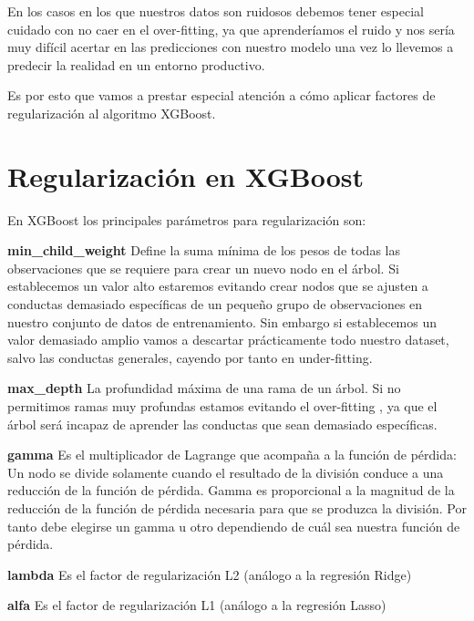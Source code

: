 En los casos en los que nuestros datos son ruidosos debemos tener especial cuidado con no caer en el over-fitting, ya que aprenderíamos el ruido y nos sería muy difícil acertar en las predicciones con nuestro modelo una vez lo llevemos a predecir la realidad en un entorno productivo.

Es por esto que vamos a prestar especial atención a cómo aplicar factores de regularización al algoritmo XGBoost.

\section{Regularización en XGBoost}

En XGBoost los principales parámetros para regularización son:

\textbf{min\_child\_weight}
Define la suma mínima de los pesos de todas las observaciones que se requiere para crear un nuevo nodo en el árbol.
Si establecemos un valor alto estaremos evitando crear nodos que se ajusten a conductas demasiado específicas de un pequeño grupo de observaciones en nuestro conjunto de datos de entrenamiento.
Sin embargo si establecemos un valor demasiado amplio vamos a descartar prácticamente todo nuestro dataset, salvo las conductas generales, cayendo por tanto en under-fitting.


\textbf{max\_depth} 
La profundidad máxima de una rama de un árbol.
Si no permitimos ramas muy profundas estamos evitando el over-fitting , ya que el árbol será incapaz de aprender las conductas que sean demasiado específicas.

\textbf{gamma}
Es el multiplicador de Lagrange que acompaña a la función de pérdida:
Un nodo se divide solamente cuando el resultado de la división conduce a una reducción de la función de pérdida. Gamma es proporcional a la magnitud de la reducción de la función de pérdida necesaria para que se produzca la división. Por tanto debe elegirse un gamma u otro dependiendo de cuál sea nuestra función de pérdida.

\textbf{lambda}
Es el factor de regularización L2 (análogo a la regresión Ridge)

\textbf{alfa}
Es el factor de regularización L1 (análogo a la regresión Lasso)








































